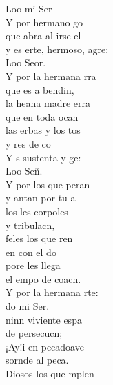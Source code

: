 \documentclass[12pt]{article}
\begin{document}
\begin{multicols*}{2}
\begin{cancion}
	Loo mi Ser\\
	Y por  hermano go\\
	que abra al irse el \\
	y es erte, hermoso, agre:\\
	Loo Seor.\\
	Y por la hermana rra\\
	que es a bendin, \\
	la heana madre erra\\
	que  en toda ocan \\
	las erbas y los tos \\
	y res de co\\
	Y s sustenta y ge: \\
	Loo Señ. \\
	Y por los que peran\\
	y antan por tu a\\
	los les corpoles \\
	y  tribulacn,\\
	feles los que ren \\
	en  con el do\\
	pore les llega\\
	el empo de  coacn. \\
	Y por la hermana rte:\\
	do mi Ser.\\
	ninn viviente espa  \\
	de  persecucn;\\
	¡Ay!i en pecadoave\\
	sornde al peca.\\
	Diosos los que mplen \\

\end{cancion}
\end{multicols*}
\end{document}
